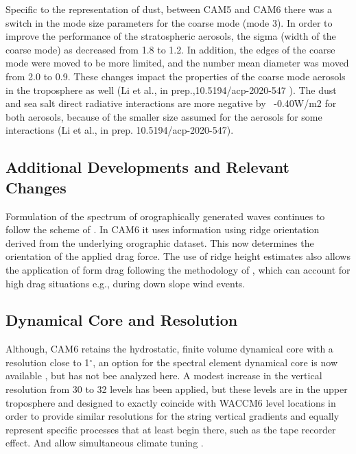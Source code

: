 Specific to the representation of dust, between CAM5 and CAM6 there was a switch in the mode size parameters for the coarse mode (mode 3).  In order to improve the performance of the stratospheric aerosols, the sigma (width of the coarse mode) as decreased from 1.8 to 1.2. In addition, the edges of the coarse mode were moved to be more limited, and the number mean diameter was moved  from 2.0 to 0.9. These changes impact the properties of the coarse mode aerosols in the troposphere as well (Li et al., in prep.,10.5194/acp-2020-547 ).  The dust and sea salt direct radiative interactions are more negative by ~-0.40W/m2 for both aerosols, because of the smaller size assumed for the aerosols for some interactions (Li et al., in prep. 10.5194/acp-2020-547).

\subsection{Additional Developments and Relevant Changes}

Formulation of the spectrum of orographically generated waves continues to follow the scheme of \citep{McFarlane1987}. In CAM6 it uses information using ridge orientation derived from the underlying orographic dataset. This now determines the orientation of the applied drag force. The use of ridge height estimates also allows the application of form drag following the methodology of \cite{Scinocca2000}, which can account for high drag situations e.g., during down slope wind events.

\subsection{Dynamical Core and Resolution}
Although, CAM6 retains the hydrostatic, finite volume \citep{Lin1996,Lin2004} dynamical core with a resolution close to 1$^\circ$, an option for the spectral element dynamical core is now available \citep{Lauritzen2018}, but has not bee analyzed here. A modest increase in the vertical resolution from 30 to 32 levels has been applied, but these levels are in the upper troposphere and designed to exactly coincide with WACCM6 level locations in order to provide similar resolutions for the string vertical gradients and equally represent specific processes that at least begin there, such as the tape recorder effect. And allow simultaneous climate tuning \citep{Gettelman2019}.

